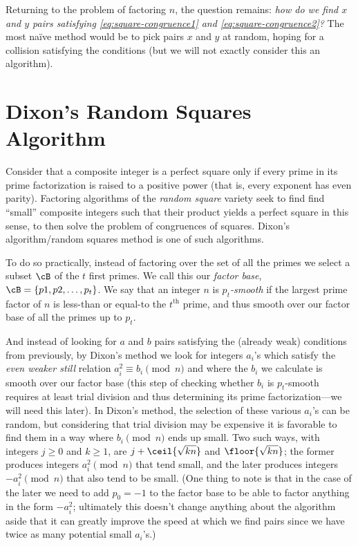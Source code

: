 \documentclass{report}
\begin{document}
Returning to the problem of factoring $n$, the question remains:
\emph{how do we find $x$ and $y$ pairs satisfying \cref{eq:square-congruence1} and
\cref{eq:square-congruence2}?}
The most naïve method would be to pick pairs $x$ and $y$ at random, hoping for a collision
satisfying the conditions (but we will not exactly consider this an algorithm).

\section{Dixon's Random Squares Algorithm}

Consider that a composite integer is a perfect square only if every prime in its prime factorization
is raised to a positive power (that is, every exponent has even parity). Factoring algorithms of the
\emph{random square} variety seek to find find ``small'' composite integers such that their product
yields a perfect square in this sense, to then solve the problem of congruences of squares.
Dixon's algorithm/random squares method is one of such algorithms.

To do so practically, instead of factoring over the set of all the primes we select a subset $\cB$
of the $t$ first primes. We call this our \emph{factor base}, $\cB = \{p1,p2,\ldots,p_t\}$.
We say that an integer $n$ is \emph{$p_t$-smooth} if the largest prime factor of $n$ is less-than or
equal-to the $t^\text{th}$ prime, and thus smooth over our factor base of all the primes up to $p_t$.

And instead of looking for $a$ and $b$ pairs satisfying the (already weak) conditions from previously,
by Dixon's method we look for integers $a_i$'s which satisfy the \emph{even weaker still} relation
$a_i^2\equiv b_i\pmod n$ and where the $b_i$ we calculate is smooth over our factor base
(this step of checking whether $b_i$ is $p_t$-smooth requires at least trial division and thus
determining its prime factorization---we will need this later).
In Dixon's method, the selection of these various $a_i$'s can be random, but considering that trial
division may be expensive it is favorable to find them in a way where $b_i\pmod n$ ends up small.
Two such ways, with integers $j\ge 0$ and $k\ge 1$, are $j+\ceil{\sqrt{kn}}$ and
$\floor{\sqrt{kn}}$; the former produces integers $a_i^2\pmod n$ that tend small, and
the later produces integers $-a_i^2\pmod n$ that also tend to be small.
(One thing to note is that in the case of the later we need to add $p_0=-1$ to the
factor base to be able to factor anything in the form $-a_i^2$; ultimately this doesn't change
anything about the algorithm aside that it can greatly improve the speed at which we find pairs
since we have twice as many potential small $a_i$'s.)
\end{document}
